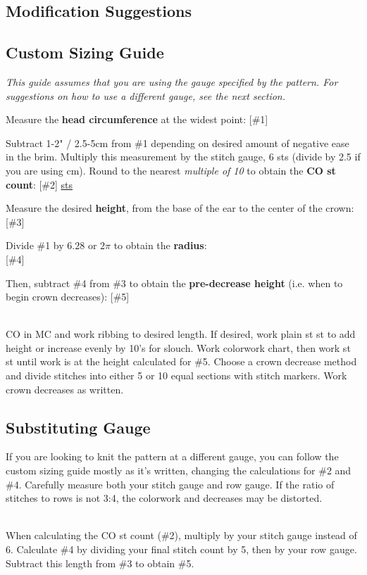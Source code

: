 \documentclass[12pt]{article}
\begin{document}
\begin{multicols}{2}
\section*{Modification Suggestions}

\subsection*{Custom Sizing Guide}

\emph{\small This guide assumes that you are using the gauge specified by the pattern. For suggestions on how to use a different gauge, see the next section.}

Measure the \textbf{head circumference} at the widest point: \hfill [\#1] \underline{\hspace{5em}}

Subtract 1-2" / 2.5-5cm from \#1 depending on desired amount of negative ease in the brim. Multiply this measurement by the stitch gauge, 6 sts (divide by 2.5 if you are using cm). Round to the nearest \emph{multiple of 10} to obtain the \textbf{CO st count}: \hspace{\fill}[\#2] \underline{\hspace{4em} sts}

Measure the desired \textbf{height}, from the base of the ear to the center of the crown:\hspace{\fill} [\#3] \underline{\hspace{3em}}

Divide \#1 by $6.28$ or $2\pi$ to obtain the \textbf{radius}:\\ \hfill [\#4] \underline{\hspace{5em}}

Then, subtract \#4 from \#3 to obtain the \textbf{pre-decrease height} (i.e. when to begin crown decreases): \hfill [\#5] \underline{\hspace{5em}}

~\\
CO in MC and work ribbing to desired length. If desired, work plain st st to add height or increase evenly by 10's for slouch. Work colorwork chart, then work st st until work is at the height calculated for \#5. Choose a crown decrease method and divide stitches into either 5 or 10 equal sections with stitch markers. Work crown decreases as written.

\subsection*{Substituting Gauge}

If you are looking to knit the pattern at a different gauge, you can follow the custom sizing guide mostly as it's written, changing the calculations for \#2 and \#4. Carefully measure both your stitch gauge and row gauge. If the ratio of stitches to rows is not 3:4, the colorwork and decreases may be distorted.

~\\
When calculating the CO st count (\#2), multiply by your stitch gauge instead of 6. Calculate \#4 by dividing your final stitch count by 5, then by your row gauge. Subtract this length from \#3 to obtain \#5.

\end{multicols}
\end{document}
